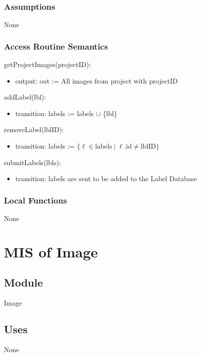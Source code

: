 \documentclass[12pt, titlepage]{article}
\begin{document}
\subsubsection{Assumptions}
None

\subsubsection{Access Routine Semantics}

\noindent getProjectImages(projectID):
\begin{itemize}
\item output: out := All images from project with projectID
\end{itemize}

\noindent addLabel(lbl):
\begin{itemize}
\item transition: labels := labels $ \cup$ \{lbl\}
\end{itemize}

\noindent removeLabel(lblID):
\begin{itemize}
\item transition: labels := $ \{ \ell \in \text{labels} \mid \ell.\text{id} \neq \text{lblID} \}$
\end{itemize}

\noindent submitLabels(lbls):
\begin{itemize}
\item transition: labels are sent to be added to the Label Database
\end{itemize}

\subsubsection{Local Functions}
None

\section{MIS of Image} \label{image}

\subsection{Module}

Image

\subsection{Uses}
None
\end{document}
